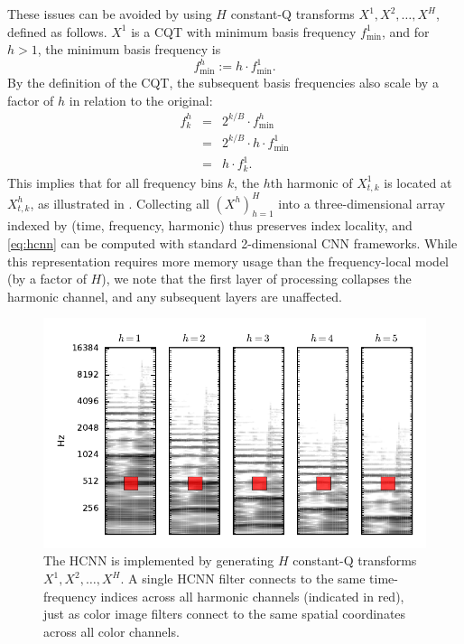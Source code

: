 \documentclass{article}
\begin{document}
These issues can be avoided by using $H$ constant-Q transforms $X^1, X^2, \dots, X^H$, defined as follows.
$X^1$ is a CQT with minimum basis frequency $f^1_{\min}$,
and for $h > 1$, the minimum basis frequency is
\begin{equation}
    f^h_{\min} := h \cdot f^1_{\min}.\label{eq:fmin}
\end{equation}
By the definition of the CQT, the subsequent basis frequencies also scale by a factor of $h$ in relation to the original:
\begin{eqnarray}
    f^h_k &=& 2^{k/B} \cdot f^h_{\min}\\
        &=& 2^{k/B} \cdot h \cdot f^1_{\min}\\
    &=& h \cdot f^1_k.
\end{eqnarray}
This implies that for all frequency bins $k$, the $h$th harmonic of $X^1_{t, k}$ is located at $X^h_{t, k}$, as illustrated in .
Collecting all ${(X^h)}_{h=1}^H$ into a three-dimensional array indexed by (time, frequency, harmonic) thus preserves index locality, and \cref{eq:hcnn} can be computed with standard 2-dimensional CNN frameworks.
While this representation requires more memory usage than the frequency-local model (by a factor of $H$), we note that the first layer of processing collapses the harmonic channel, and any subsequent layers are unaffected.


\begin{figure}
    \includegraphics[width=\columnwidth]{figs/hcnn}
    \caption{The HCNN is implemented by generating $H$ constant-Q transforms $X^1, X^2, \ldots, X^H$.
    A single HCNN filter connects to the same time-frequency indices across all harmonic channels (indicated in red), just as color image filters connect to the same spatial coordinates across all color channels.}
\label{fig:hcnn}
\end{figure}
\end{document}
